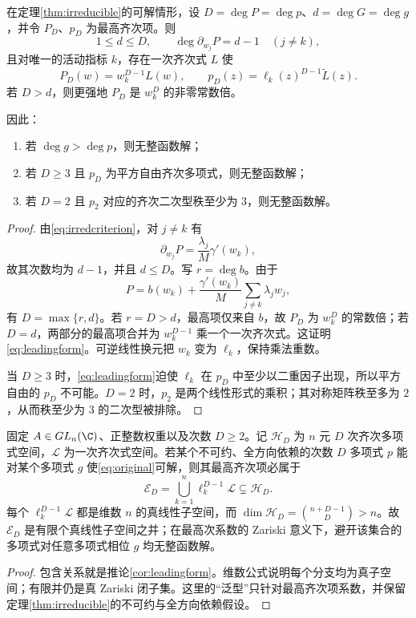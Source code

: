 \begin{corollary}[次数与最高齐次项障碍]\label{cor:leadingform}
在定理\ref{thm:irreducible}的可解情形，设 $D=\deg P=\deg p$、$d=\deg G=\deg g$，并令 $P_D$、$p_D$ 为最高齐次项。则
\begin{equation}\label{eq:degreeobstruction}
1\le d\le D,
\qquad \deg \partial_{w_j}P=d-1\quad(j\ne k),
\end{equation}
且对唯一的活动指标 $k$，存在一次齐次式 $L$ 使
\begin{equation}\label{eq:leadingform}
P_D(w)=w_k^{D-1}L(w),
\qquad
p_D(z)=\ell_k(z)^{D-1}\widetilde L(z).
\end{equation}
若 $D>d$，则更强地 $P_D$ 是 $w_k^D$ 的非零常数倍。

因此：
\begin{enumerate}[label=(\roman*)]
\item 若 $\deg g>\deg p$，则无整函数解；
\item 若 $D\ge3$ 且 $p_D$ 为平方自由齐次多项式，则无整函数解；
\item 若 $D=2$ 且 $p_2$ 对应的齐次二次型秩至少为 $3$，则无整函数解。
\end{enumerate}
\end{corollary}
\begin{proof}
由\eqref{eq:irredcriterion}，对 $j\ne k$ 有
\[
\partial_{w_j}P=\frac{\lambda_j}{M}\gamma'(w_k),
\]
故其次数均为 $d-1$，并且 $d\le D$。写 $r=\deg b$。由于
\[
P=b(w_k)+\frac{\gamma'(w_k)}{M}\sum_{j\ne k}\lambda_jw_j,
\]
有 $D=\max\{r,d\}$。若 $r=D>d$，最高项仅来自 $b$，故 $P_D$ 为 $w_k^D$ 的常数倍；若 $D=d$，两部分的最高项合并为 $w_k^{D-1}$ 乘一个一次齐次式。这证明\eqref{eq:leadingform}。可逆线性换元把 $w_k$ 变为 $\ell_k$，保持乘法重数。

当 $D\ge3$ 时，\eqref{eq:leadingform}迫使 $\ell_k$ 在 $p_D$ 中至少以二重因子出现，所以平方自由的 $p_D$ 不可能。$D=2$ 时，$p_2$ 是两个线性形式的乘积；其对称矩阵秩至多为 $2$，从而秩至少为 $3$ 的二次型被排除。
\end{proof}

\begin{corollary}[固定方向系下的泛型无解]\label{cor:generic}
固定 $A\in GL_n(\C)$、正整数权重以及次数 $D\ge2$。记 $\mathcal H_D$ 为 $n$ 元 $D$ 次齐次多项式空间，$\mathcal L$ 为一次齐次式空间。若某个不可约、全方向依赖的次数 $D$ 多项式 $p$ 能对某个多项式 $g$ 使\eqref{eq:original}可解，则其最高齐次项必属于
\begin{equation}\label{eq:exceptionalset}
\mathcal E_D=
\bigcup_{k=1}^n \ell_k^{D-1}\mathcal L\subsetneq\mathcal H_D.
\end{equation}
每个 $\ell_k^{D-1}\mathcal L$ 都是维数 $n$ 的真线性子空间，而
$\dim\mathcal H_D=\binom{n+D-1}{D}>n$。故 $\mathcal E_D$ 是有限个真线性子空间之并；在最高次系数的 Zariski 意义下，避开该集合的多项式对任意多项式相位 $g$ 均无整函数解。
\end{corollary}
\begin{proof}
包含关系就是推论\ref{cor:leadingform}。维数公式说明每个分支均为真子空间；有限并仍是真 Zariski 闭子集。这里的“泛型”只针对最高齐次项系数，并保留定理\ref{thm:irreducible}的不可约与全方向依赖假设。
\end{proof}

